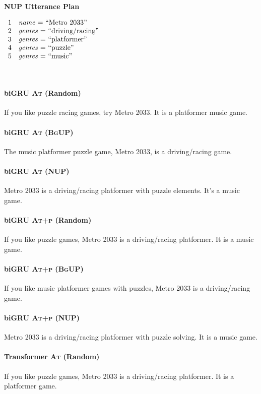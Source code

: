 \noindent
\parbox{.333\textwidth}{\textbf{\textsc{NUP} Utterance Plan}}
$\begin{array}{ll}
1  &  \textrm{\textit{name} = ``Metro 2033''} \\
2  &  \textrm{\textit{genres} = ``driving/racing''} \\
3  &  \textrm{\textit{genres} = ``platformer''} \\
4  &  \textrm{\textit{genres} = ``puzzle''} \\
5  &  \textrm{\textit{genres} = ``music''} \\
\end{array}$

~\\

\paragraph{biGRU \textsc{At} (Random)}
If you like puzzle racing games, try Metro 2033. It is a platformer music game.

\paragraph{biGRU \textsc{At (BgUP)}}
The music platformer puzzle game, Metro 2033, is a driving/racing game.

\paragraph{biGRU \textsc{At} (NUP)}
Metro 2033 is a driving/racing platformer with puzzle elements. It's a music game.


\paragraph{biGRU \textsc{At+p} (Random)}
If you like puzzle games, Metro 2033 is a driving/racing platformer. It is a music game.

\paragraph{biGRU \textsc{At+p (BgUP)}}
If you like music platformer games with puzzles, Metro 2033 is a driving/racing game.

\paragraph{biGRU \textsc{At+p} (NUP)}
Metro 2033 is a driving/racing platformer with puzzle solving. It is a music game.

\paragraph{Transformer \textsc{At} (Random)}
If you like puzzle games, Metro 2033 is a driving/racing platformer. It is a platformer game.

